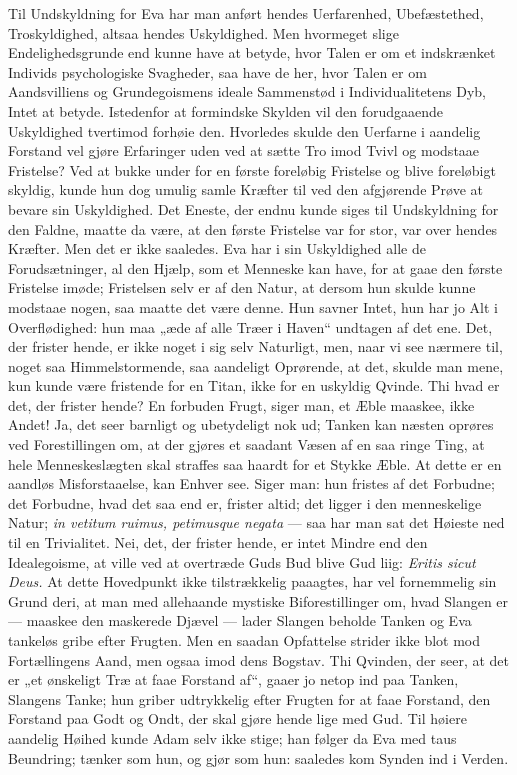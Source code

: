 \documentclass[12pt]{book}
\begin{document}
Til Undskyldning for Eva har man anført hendes Uerfarenhed,
Ubefæstethed, Troskyldighed, altsaa hendes Uskyldighed. Men
hvormeget slige Endelighedsgrunde end kunne have at betyde, hvor
Talen er om et indskrænket Individs psychologiske Svagheder, saa
have de her, hvor Talen er om Aandsvilliens og Grundegoismens ideale
Sammenstød i Individualitetens Dyb, Intet at betyde. Istedenfor at
formindske Skylden vil den forudgaaende Uskyldighed tvertimod
forhøie den. Hvorledes skulde den Uerfarne i aandelig Forstand vel
gjøre Erfaringer uden ved at sætte Tro imod Tvivl og modstaae
Fristelse? Ved at bukke under for en første foreløbig Fristelse og
blive foreløbigt skyldig, kunde hun dog umulig samle Kræfter til ved
den afgjørende Prøve at bevare sin Uskyldighed. Det Eneste, der
endnu kunde siges til Undskyldning for den Faldne, maatte da være,
at den første Fristelse var for stor, var over hendes Kræfter. Men
det er ikke saaledes. Eva har i sin Uskyldighed alle de
Forudsætninger, al den Hjælp, som et Menneske kan have, for at gaae
den første Fristelse imøde; Fristelsen selv er af den Natur, at
dersom hun skulde kunne modstaae nogen, saa maatte det være denne.
Hun savner Intet, hun har jo Alt i Overflødighed: hun maa „æde af
alle Træer i Haven“ undtagen af det ene. Det, der frister hende, er
ikke noget i sig selv Naturligt, men, naar vi see nærmere til, noget
saa Himmelstormende, saa aandeligt Oprørende, at det, skulde man
mene, kun kunde være fristende for en Titan, ikke for en uskyldig
Qvinde. Thi hvad er det, der frister hende? En forbuden Frugt,
siger man, et Æble maaskee, ikke Andet! Ja, det seer barnligt og
ubetydeligt nok ud; Tanken kan næsten oprøres ved Forestillingen om,
at der gjøres et saadant
Væsen af en saa ringe Ting, at hele Menneskeslægten skal straffes
saa haardt for et Stykke Æble. At dette er en aandløs
Misforstaaelse, kan Enhver see. Siger man: hun fristes af det
Forbudne; det Forbudne, hvad det saa end er, frister altid; det
ligger i den menneskelige Natur; \textit{in vetitum ruimus,
petimusque negata} --- saa har man sat det Høieste ned til en
Trivialitet. Nei, det, der frister hende, er intet Mindre end den
Idealegoisme, at ville ved at overtræde Guds Bud blive Gud liig:
\textit{Eritis sicut Deus.} At dette Hovedpunkt ikke tilstrækkelig
paaagtes, har vel fornemmelig sin Grund deri, at man med allehaande
mystiske Biforestillinger om, hvad Slangen er --- maaskee den
maskerede Djævel --- lader Slangen beholde Tanken og Eva tankeløs
gribe efter Frugten. Men en saadan Opfattelse strider ikke blot mod
Fortællingens Aand, men ogsaa imod dens Bogstav. Thi Qvinden, der
seer, at det er „et ønskeligt Træ at faae Forstand af“, gaaer jo
netop ind paa Tanken, Slangens Tanke; hun griber udtrykkelig efter
Frugten for at faae Forstand, den Forstand paa Godt og Ondt, der
skal gjøre hende lige med Gud. Til høiere aandelig Høihed kunde
Adam selv ikke stige; han følger da Eva med taus Beundring; tænker
som hun, og gjør som hun: saaledes kom Synden ind i Verden.
\end{document}
